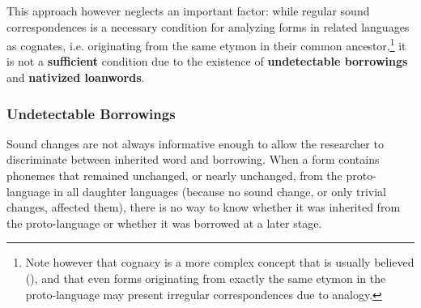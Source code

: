 \documentclass[svgnames,12pt]{scrartcl}
\begin{document}
{{This approach however neglects an important factor: while regular sound correspondences is a
necessary condition for analyzing forms in related languages as cognates, i.e. originating from the
same etymon in their common ancestor,\footnote{Note however that cognacy is a more complex concept
that is usually believed (\citealt{list16cognacy}), and that even forms originating from exactly the
same etymon in the proto-language may present irregular correspondences due to analogy.} it is not
a \textbf{sufficient} condition due to the existence of \textbf{undetectable borrowings} and
\textbf{nativized loanwords}.  



\subsubsection{Undetectable Borrowings}
Sound changes are not always informative enough to allow the researcher to discriminate between inherited word and borrowing. When a form contains phonemes that remained unchanged, or nearly unchanged, from the proto-language in all daughter languages (because no sound change, or only trivial changes, affected them), there is no way to know whether it was inherited from the proto-language or whether it was borrowed at a later stage. 

}}
\end{document}
